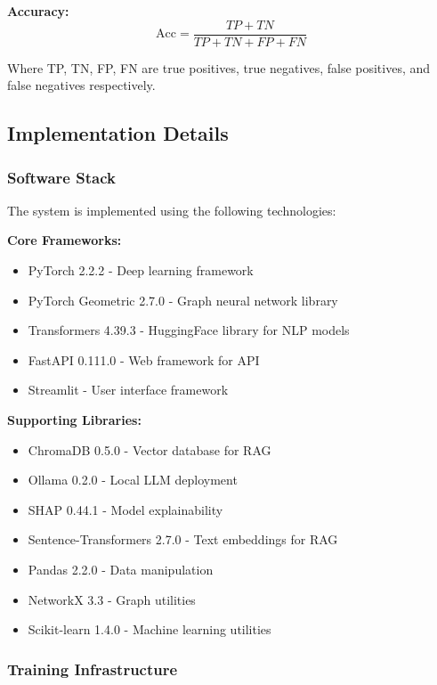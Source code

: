 \textbf{Accuracy:}
\begin{equation}
\text{Acc} = \frac{TP + TN}{TP + TN + FP + FN}
\end{equation}

Where TP, TN, FP, FN are true positives, true negatives, false positives, and false negatives respectively.

\subsection{Implementation Details}

\subsubsection{Software Stack}

The system is implemented using the following technologies:

\textbf{Core Frameworks:}
\begin{itemize}
    \item PyTorch 2.2.2 \cite{goodfellow2016deep} - Deep learning framework
    \item PyTorch Geometric 2.7.0 - Graph neural network library
    \item Transformers 4.39.3 - HuggingFace library for NLP models
    \item FastAPI 0.111.0 - Web framework for API
    \item Streamlit - User interface framework
\end{itemize}

\textbf{Supporting Libraries:}
\begin{itemize}
    \item ChromaDB 0.5.0 - Vector database for RAG
    \item Ollama 0.2.0 - Local LLM deployment
    \item SHAP 0.44.1 - Model explainability
    \item Sentence-Transformers 2.7.0 - Text embeddings for RAG
    \item Pandas 2.2.0 - Data manipulation
    \item NetworkX 3.3 - Graph utilities
    \item Scikit-learn 1.4.0 - Machine learning utilities
\end{itemize}

\subsubsection{Training Infrastructure}

